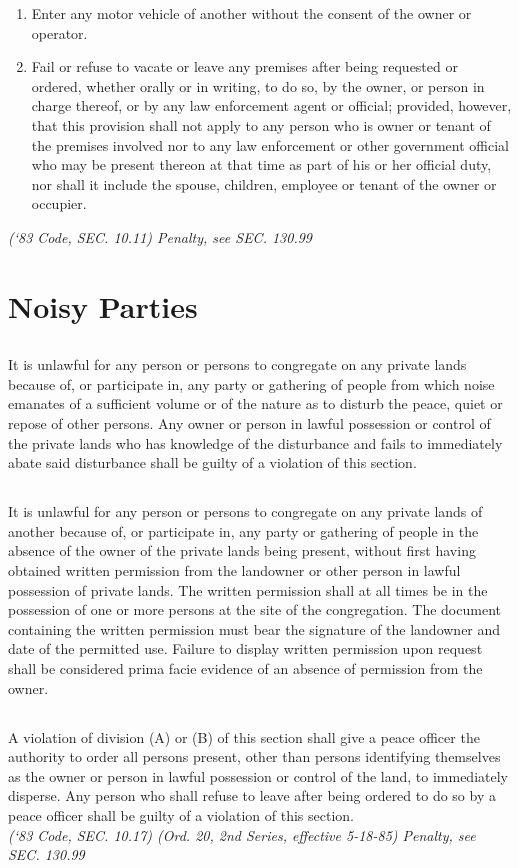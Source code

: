\begin{enumerate}[{\indent}A)]
    \item Enter any motor vehicle of another without the consent of the owner or operator.
    \item Fail or refuse to vacate or leave any premises after being requested or ordered, whether orally or in writing, to do so, by the owner, or person in charge thereof, or by any law enforcement agent or official; provided, however, that this provision shall not apply to any person who is owner or tenant of the premises involved nor to any law enforcement or other government official who may be present thereon at that time as part of his or her official duty, nor shall it include the spouse, children, employee or tenant of the owner or occupier.
\end{enumerate}
\emph{(‘83 Code, SEC. 10.11)  Penalty, see SEC. 130.99}
\section{Noisy Parties}
\subsection{}
It is unlawful for any person or persons to congregate on any private lands because of, or participate in, any party or gathering of people from which noise emanates of a sufficient volume or of the nature as to disturb the peace, quiet or repose of other persons. Any owner or person in lawful possession or control of the private lands who has knowledge of the disturbance and fails to immediately abate said disturbance shall be guilty of a violation of this section.
\subsection{}
It is unlawful for any person or persons to congregate on any private lands of another because of, or participate in, any party or gathering of people in the absence of the owner of the private lands being present, without first having obtained written permission from the landowner or other person in lawful possession of private lands. The written permission shall at all times be in the possession of one or more persons at the site of the congregation. The document containing the written permission must bear the signature of the landowner and date of the permitted use. Failure to display written permission upon request shall be considered prima facie evidence of an absence of permission from the owner.
\subsection{}
A violation of division (A) or (B) of this section shall give a peace officer the authority to order all persons present, other than persons identifying themselves as the owner or person in lawful possession or control of the land, to immediately disperse. Any person who shall refuse to leave after being ordered to do so by a peace officer shall be guilty of a violation of this section.\\
\emph{(‘83 Code, SEC. 10.17)  (Ord. 20, 2nd Series, effective 5-18-85)  Penalty, see SEC. 130.99}
